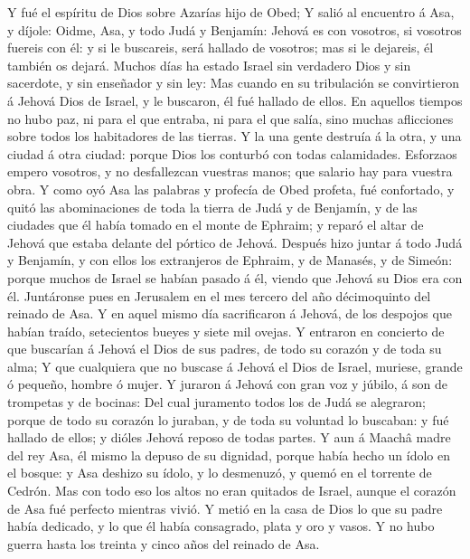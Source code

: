  Y fué el espíritu de Dios sobre Azarías hijo de Obed;
 Y salió al encuentro á Asa, y díjole: Oidme, Asa, y todo
Judá y Benjamín: Jehová es con vosotros, si vosotros fuereis con él: y
si le buscareis, será hallado de vosotros; mas si le dejareis, él
también os dejará.  Muchos días ha estado Israel sin
verdadero Dios y sin sacerdote, y sin enseñador y sin ley:
 Mas cuando en su tribulación se convirtieron á Jehová
Dios de Israel, y le buscaron, él fué hallado de ellos. 
En aquellos tiempos no hubo paz, ni para el que entraba, ni para el que
salía, sino muchas aflicciones sobre todos los habitadores de las
tierras.  Y la una gente destruía á la otra, y una ciudad
á otra ciudad: porque Dios los conturbó con todas calamidades.
 Esforzaos empero vosotros, y no desfallezcan vuestras
manos; que salario hay para vuestra obra.  Y como oyó Asa
las palabras y profecía de Obed profeta, fué confortado, y quitó las
abominaciones de toda la tierra de Judá y de Benjamín, y de las ciudades
que él había tomado en el monte de Ephraim; y reparó el altar de Jehová
que estaba delante del pórtico de Jehová.  Después hizo
juntar á todo Judá y Benjamín, y con ellos los extranjeros de Ephraim, y
de Manasés, y de Simeón: porque muchos de Israel se habían pasado á él,
viendo que Jehová su Dios era con él.  Juntáronse pues en
Jerusalem en el mes tercero del año décimoquinto del reinado de Asa.
 Y en aquel mismo día sacrificaron á Jehová, de los
despojos que habían traído, setecientos bueyes y siete mil ovejas.
 Y entraron en concierto de que buscarían á Jehová el
Dios de sus padres, de todo su corazón y de toda su alma;
 Y que cualquiera que no buscase á Jehová el Dios de
Israel, muriese, grande ó pequeño, hombre ó mujer.  Y
juraron á Jehová con gran voz y júbilo, á son de trompetas y de bocinas:
 Del cual juramento todos los de Judá se alegraron;
porque de todo su corazón lo juraban, y de toda su voluntad lo buscaban:
y fué hallado de ellos; y dióles Jehová reposo de todas partes.
 Y aun á Maachâ madre del rey Asa, él mismo la depuso de
su dignidad, porque había hecho un ídolo en el bosque: y Asa deshizo su
ídolo, y lo desmenuzó, y quemó en el torrente de Cedrón. 
Mas con todo eso los altos no eran quitados de Israel, aunque el corazón
de Asa fué perfecto mientras vivió.  Y metió en la casa
de Dios lo que su padre había dedicado, y lo que él había consagrado,
plata y oro y vasos.  Y no hubo guerra hasta los treinta
y cinco años del reinado de Asa.

